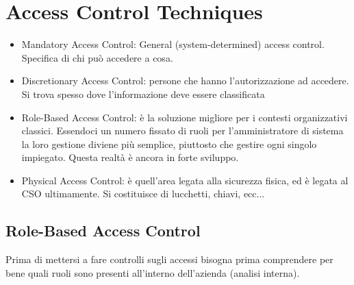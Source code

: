 \chapter{Access Control Techniques}
\label{AccessControlTechniques}
\begin{itemize}
 \item Mandatory Access Control: General (system-determined) access control.
 Specifica di chi può accedere a cosa.
 \item Discretionary Access Control: persone che hanno l'autorizzazione ad
 accedere. Si trova spesso dove l'informazione deve essere classificata
 \item Role-Based Access Control: è la soluzione migliore per i contesti
 organizzativi classici. Essendoci un numero fissato di ruoli per
 l'amministratore di sistema la loro gestione diviene più semplice, piuttosto
che gestire ogni singolo impiegato. Questa realtà è ancora in forte sviluppo.
 \item Physical Access Control: è quell'area legata alla sicurezza fisica, ed è
 legata al CSO ultimamente. Si costituisce di lucchetti, chiavi, ecc...
\end{itemize}


\section{Role-Based Access Control}


Prima di mettersi a fare controlli sugli accessi bisogna prima comprendere per
bene quali ruoli sono presenti all'interno dell'azienda (analisi interna).

\begin{table}[H]
\centering
{}
\caption{Un esempio di un \textit{Role-Based Access Control}}
\end{table}



